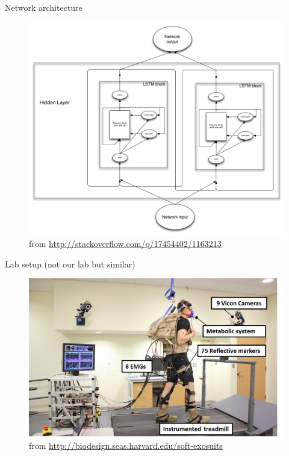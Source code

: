 \documentclass{beamer}
\begin{document}
\begin{frame}{Network architecture}
    \begin{figure}[H]
        \begin{center}
        \includegraphics[height=.7\textheight]{figures/lstm2.png} \\
        \tiny from \url{http://stackoverflow.com/q/17454402/1163213}
        \end{center}
    \end{figure}
\end{frame}
\begin{frame}{Lab setup (not our lab but similar)}
    \begin{figure}[H]
        \begin{center}
        \includegraphics[height=.7\textheight]{figures/treadmill.png} \\
        \tiny from \url{http://biodesign.seas.harvard.edu/soft-exosuits}
        \end{center}
    \end{figure}
\end{frame}
\end{document}
